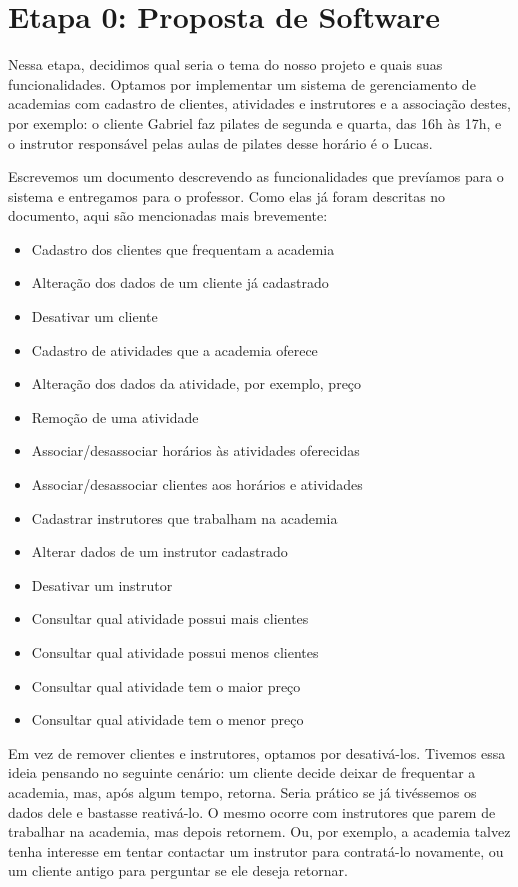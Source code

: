 \documentclass[11pt,twoside]{article}
\begin{document}
\clearpage
\tableofcontents

\clearpage

\section{Etapa 0: Proposta de Software}
Nessa etapa, decidimos qual seria o tema do nosso projeto e quais suas funcionalidades.
Optamos por implementar um sistema de gerenciamento de academias com cadastro de clientes, atividades
e instrutores e a associação destes, por exemplo: o cliente Gabriel faz pilates
de segunda e quarta, das 16h às 17h, e o instrutor responsável pelas aulas de pilates desse horário é o Lucas.

Escrevemos um documento descrevendo as funcionalidades que prevíamos para o sistema e entregamos para o professor.
Como elas já foram descritas no documento, aqui são mencionadas mais brevemente:

\begin{itemize}
  \item Cadastro dos clientes que frequentam a academia
  \item Alteração dos dados de um cliente já cadastrado
  \item Desativar um cliente
  \item Cadastro de atividades que a academia oferece
  \item Alteração dos dados da atividade, por exemplo, preço
  \item Remoção de uma atividade
  \item Associar/desassociar horários às atividades oferecidas
  \item Associar/desassociar clientes aos horários e atividades
  \item Cadastrar instrutores que trabalham na academia
  \item Alterar dados de um instrutor cadastrado
  \item Desativar um instrutor
  \item Consultar qual atividade possui mais clientes
  \item Consultar qual atividade possui menos clientes
  \item Consultar qual atividade tem o maior preço
  \item Consultar qual atividade tem o menor preço
\end{itemize}

Em vez de remover clientes e instrutores, optamos por desativá-los. Tivemos essa ideia pensando no seguinte cenário: um cliente
decide deixar de frequentar a academia, mas, após algum tempo, retorna. Seria prático se já tivéssemos os dados dele e bastasse
reativá-lo. O mesmo ocorre com instrutores que parem de trabalhar na academia, mas depois retornem. Ou, por exemplo, a academia
talvez tenha interesse em tentar contactar um instrutor para contratá-lo novamente, ou um cliente antigo para perguntar se ele
deseja retornar.
\end{document}
